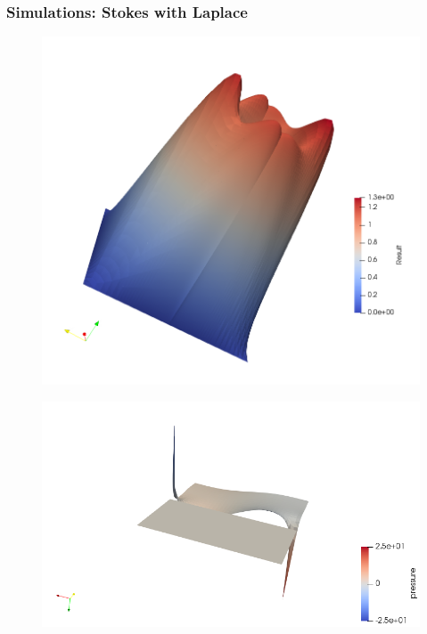 \documentclass{beamer}
\theoremstyle{definition}
\begin{document}
\begin{frame}
\frametitle{Simulations: Stokes with Laplace}

\begin{figure}
	\centering
	\begin{minipage}{0.5\textwidth}
		\centering
		\includegraphics[width=1\linewidth]{combi_u}
		\label{fig:test1}
	\end{minipage}%
	\begin{minipage}{.55\textwidth}
		\hspace{-10mm}
		\vspace{5mm}
		\centering
		\includegraphics[width=1\linewidth]{combi_p}
		\label{fig:test2}
	\end{minipage}
\end{figure}
\end{frame}    
\end{document}
